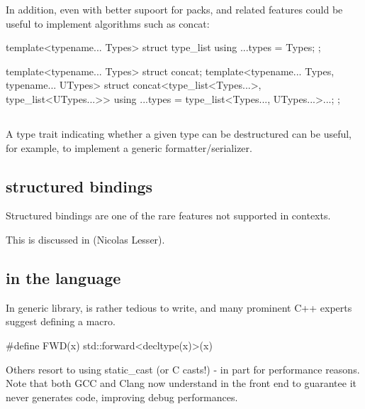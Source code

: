 \documentclass{wg21}
\begin{document}
In addition, even with better supoort for packs,  and related features could be useful to implement algorithms such as concat:

\begin{colorblock}
    template<typename... Types>
    struct type_list{
        using ...types = Types;
    };

    template<typename... Types>
    struct concat;
    template<typename... Types, typename... UTypes>
    struct concat<type_list<Types...>, type_list<UTypes...>> {
        using ...types = type_list<Types..., UTypes...>...;
    };
\end{colorblock}

\subsection{}
\label{sec:is_structured_type}

A type trait indicating whether a given type can be destructured can be useful, for example, to implement a generic
formatter/serializer.

\subsection{ structured bindings}
\label{sec:constexprstructured}

Structured bindings are one of the rare features not supported in  contexts.

This is discussed in (Nicolas Lesser).

\subsection{ in the language}
\label{sec:forward}


In generic library,  is rather tedious to write, and
many prominent C++ experts suggest defining a macro.

\begin{colorblock}
#define FWD(x) std::forward<decltype(x)>(x)
\end{colorblock}

Others resort to using static_cast (or C casts!) - in part for performance reasons.
Note that both GCC and Clang now understand  in the front end to guarantee it never generates code,
improving debug performances.
\end{document}
